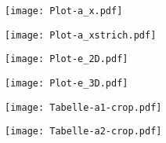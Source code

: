 

\pagestyle{empty}



\texttt{[image: Plot-a\_x.pdf]}

\texttt{[image: Plot-a\_xstrich.pdf]}

\texttt{[image: Plot-e\_2D.pdf]}

\texttt{[image: Plot-e\_3D.pdf]}

\texttt{[image: Tabelle-a1-crop.pdf]}

\texttt{[image: Tabelle-a2-crop.pdf]}




